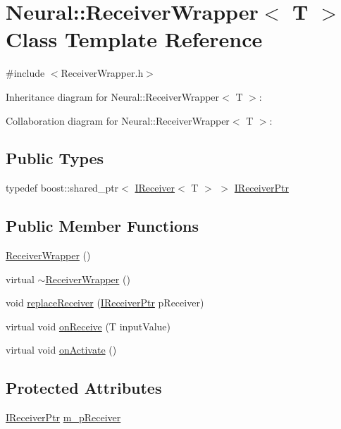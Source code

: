 \hypertarget{class_neural_1_1_receiver_wrapper}{
\section{Neural::ReceiverWrapper$<$ T $>$ Class Template Reference}
\label{class_neural_1_1_receiver_wrapper}
}


{\ttfamily \#include $<$ReceiverWrapper.h$>$}



Inheritance diagram for Neural::ReceiverWrapper$<$ T $>$:


Collaboration diagram for Neural::ReceiverWrapper$<$ T $>$:
\subsection*{Public Types}
\begin{DoxyCompactItemize}
\item 
typedef boost::shared\_\-ptr$<$ \hyperlink{class_neural_1_1_i_receiver}{IReceiver}$<$ T $>$ $>$ \hyperlink{class_neural_1_1_receiver_wrapper_a61df61d86bfd812cee8ad6feef89cfa6}{IReceiverPtr}
\end{DoxyCompactItemize}
\subsection*{Public Member Functions}
\begin{DoxyCompactItemize}
\item 
\hyperlink{class_neural_1_1_receiver_wrapper_a79023dd16ebc30708eb1fed516679a45}{ReceiverWrapper} ()
\item 
virtual \hyperlink{class_neural_1_1_receiver_wrapper_a1674b88fe0c2e7c43bf6e9348a7ae116}{$\sim$ReceiverWrapper} ()
\item 
void \hyperlink{class_neural_1_1_receiver_wrapper_abd3ca35c44db475581366acfa9afb4c6}{replaceReceiver} (\hyperlink{class_neural_1_1_receiver_wrapper_a61df61d86bfd812cee8ad6feef89cfa6}{IReceiverPtr} pReceiver)
\item 
virtual void \hyperlink{class_neural_1_1_receiver_wrapper_a81f65c6cb6dcb955ef7fb5b7b5acdbf3}{onReceive} (T inputValue)
\item 
virtual void \hyperlink{class_neural_1_1_receiver_wrapper_ab6bd2eba1f01c407a6a0004ad4c532aa}{onActivate} ()
\end{DoxyCompactItemize}
\subsection*{Protected Attributes}
\begin{DoxyCompactItemize}
\item 
\hyperlink{class_neural_1_1_receiver_wrapper_a61df61d86bfd812cee8ad6feef89cfa6}{IReceiverPtr} \hyperlink{class_neural_1_1_receiver_wrapper_a92d01ac940e30ceccafb4c247a29ba55}{m\_\-pReceiver}
\end{DoxyCompactItemize}


